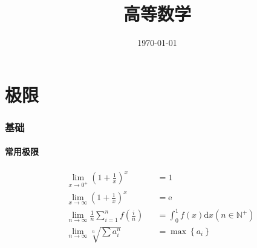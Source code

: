 \documentclass{article}
\title{高等数学}
\author{}
\date{\today}
\begin{document}
\hypersetup{
    hidelinks,
    allcolors = black,
    breaklinks = true
}

\newtheorem{definition}{Definition}[subsection]
\newtheorem{theorem}{Theorem}[subsection]
\newtheorem{corollary}{Corollary}[theorem]
\renewcommand{\proofname}{\indent\bf Proof}
\renewcommand{\Re}{\operatorname{Re}}
\renewcommand{\Im}{\operatorname{Im}}

\def\e{\mathrm e}
\def\i{\mathrm i}
\def\d{\mathrm d}
\def\C{\mathrm C}
\def\sr{\mathbb R}
\def\sn{\mathbb N}
\def\snp{\mathbb N^+}
\def\sc{\mathbb C}
\def\sz{\mathbb Z}
\def\sech{\mathrm{sech}}
\def\csch{\mathrm{csch}}

\newcommand{\abs}[1]{\left|#1\right|}
\newcommand{\p}[1]{\left(#1\right)}
\newcommand{\B}[1]{\left\{#1\right\}}
\newcommand{\jacobi}[2]{\frac{\partial\p{#1}}{\partial\p{#2}}}

\begin{titlepage}
    \maketitle
\end{titlepage}

\tableofcontents
\newpage

\part{极限}

\section{基础}

\subsection{常用极限}

\[\begin{aligned}
         & \lim_{x\to0^+}{\p{1+\frac1x}^x}                     &  & =1                              \\
         & \lim_{x\to\infty}{\p{1+\frac1x}^x}                  &  & =\e                             \\
         & \lim_{n\to\infty}{\frac1n\sum_{i=1}^nf\p{\frac in}} &  & =\int_0^1f\p{x}\d x\p{n\in\snp} \\
         & \lim_{n\to\infty}{\sqrt[n]{\sum a_i^n}}             &  & =\max{\B{a_i}}
    \end{aligned}\]
\end{document}
